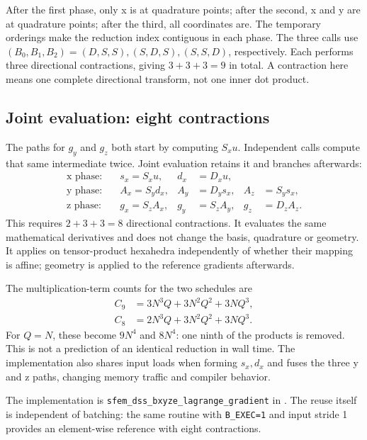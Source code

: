 \documentclass[11pt]{article}
\begin{document}
After the first phase, only x is at quadrature points; after the second, x and y
are at quadrature points; after the third, all coordinates are. The temporary
orderings make the reduction index contiguous in each phase. The three calls
use \((B_0,B_1,B_2)=(D,S,S),(S,D,S),(S,S,D)\), respectively.
Each performs three directional contractions, giving \(3+3+3=9\) in total.
A contraction here means one complete directional transform, not one inner
dot product.

\subsection{Joint evaluation: eight contractions}

The paths for \(g_y\) and \(g_z\) both start by computing \(S_xu\).
Independent calls compute that same intermediate twice. Joint evaluation
retains it and branches afterwards:
\[
\begin{aligned}
 \text{x phase:}\quad & s_x=S_xu, & d_x&=D_xu,\\
 \text{y phase:}\quad & A_x=S_yd_x, & A_y&=D_ys_x, & A_z&=S_ys_x,\\
 \text{z phase:}\quad & g_x=S_zA_x, & g_y&=S_zA_y, & g_z&=D_zA_z.
\end{aligned}
\]
This requires \(2+3+3=8\) directional contractions. It evaluates the same
mathematical derivatives and does not change the basis, quadrature or geometry.
It applies on tensor-product hexahedra independently of whether their mapping
is affine; geometry is applied to the reference gradients afterwards.

The multiplication-term counts for the two schedules are
\[
\begin{aligned}
 C_9 &= 3N^3Q+3N^2Q^2+3NQ^3,\\
 C_8 &= 2N^3Q+3N^2Q^2+3NQ^3.
\end{aligned}
\]
For \(Q=N\), these become \(9N^4\) and \(8N^4\): one ninth of the
products is removed. This is not a prediction of an identical reduction in
wall time. The implementation also shares input loads when forming \(s_x,d_x\)
and fuses the three y and z paths, changing memory traffic and compiler behavior.

The implementation is
\texttt{sfem\_dss\_bxyze\_lagrange\_gradient} in
.
The reuse itself is independent of batching: the same routine with
\texttt{B\_EXEC=1} and input stride 1 provides an element-wise reference with
eight contractions.
\end{document}
